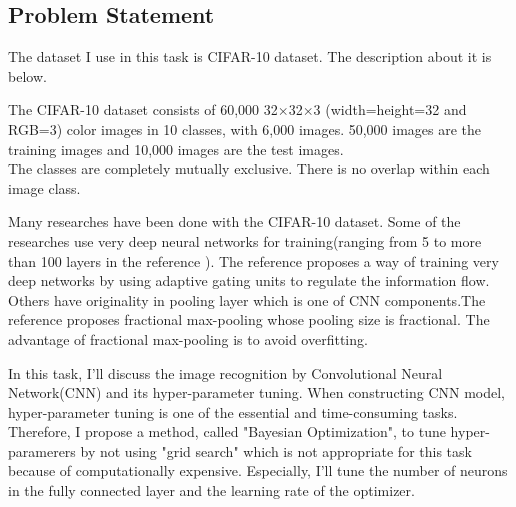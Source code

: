 \subsection{Problem Statement}


The dataset I use in this task is CIFAR-10 dataset. The description about it is below. 

The CIFAR-10 dataset consists of 60,000 32$\times$32$\times$3 (width=height=32 and RGB=3) color images in 10 classes, with 6,000 images. 50,000 images are the training images and 10,000 images are the test images.\\
The classes are completely mutually exclusive. There is no overlap within each image class.



Many researches have been done with the CIFAR-10 dataset. Some of the researches use very deep neural networks for training(ranging from 5 to more than 100 layers in the reference \cite{Very deep}). The reference proposes a way of training very deep networks by using adaptive gating units to regulate the information flow. Others have originality in pooling layer which is one of CNN components.The reference \cite{Fractional} proposes fractional max-pooling whose pooling size is fractional. The advantage of fractional max-pooling is to avoid overfitting.



In this task, I'll discuss the image recognition by Convolutional Neural Network(CNN) and its hyper-parameter tuning. When constructing CNN model, hyper-parameter tuning is one of the essential and time-consuming tasks. Therefore, I propose a method, called "Bayesian Optimization", to tune hyper-paramerers by not using "grid search" which is not appropriate for this task because of computationally expensive. Especially, I'll tune the number of neurons in the fully connected layer and the learning rate of the optimizer.